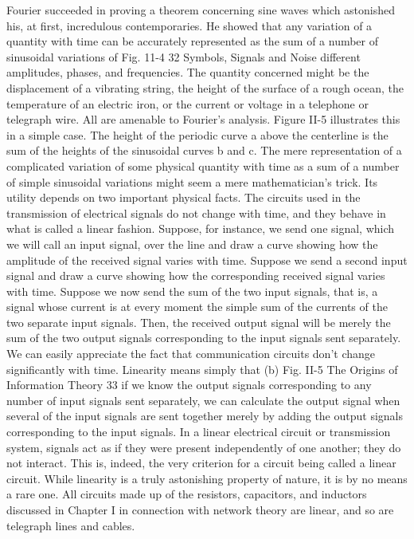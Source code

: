 Fourier succeeded in proving a theorem concerning sine waves
which astonished his, at first, incredulous contemporaries. He
showed that any variation of a quantity with time can be accurately
represented as the sum of a number of sinusoidal variations of
Fig. 11-4
32 Symbols, Signals and Noise
different amplitudes, phases, and frequencies. The quantity concerned
might be the displacement of a vibrating string, the height
of the surface of a rough ocean, the temperature of an electric iron,
or the current or voltage in a telephone or telegraph wire. All are
amenable to Fourier’s analysis. Figure II-5 illustrates this in a
simple case. The height of the periodic curve a above the centerline
is the sum of the heights of the sinusoidal curves b and c.
The mere representation of a complicated variation of some
physical quantity with time as a sum of a number of simple sinusoidal
variations might seem a mere mathematician’s trick. Its
utility depends on two important physical facts. The circuits used
in the transmission of electrical signals do not change with time,
and they behave in what is called a linear fashion. Suppose, for
instance, we send one signal, which we will call an input signal,
over the line and draw a curve showing how the amplitude of the
received signal varies with time. Suppose we send a second input
signal and draw a curve showing how the corresponding received
signal varies with time. Suppose we now send the sum of the two
input signals, that is, a signal whose current is at every moment
the simple sum of the currents of the two separate input signals.
Then, the received output signal will be merely the sum of the two
output signals corresponding to the input signals sent separately.
We can easily appreciate the fact that communication circuits
don’t change significantly with time. Linearity means simply that
(b)
Fig. II-5
The Origins of Information Theory
33
if we know the output signals corresponding to any number of
input signals sent separately, we can calculate the output signal
when several of the input signals are sent together merely by adding
the output signals corresponding to the input signals. In a linear
electrical circuit or transmission system, signals act as if they were
present independently of one another; they do not interact. This is,
indeed, the very criterion for a circuit being called a linear circuit.
While linearity is a truly astonishing property of nature, it is by
no means a rare one. All circuits made up of the resistors, capacitors,
and inductors discussed in Chapter I in connection with
network theory are linear, and so are telegraph lines and cables.

